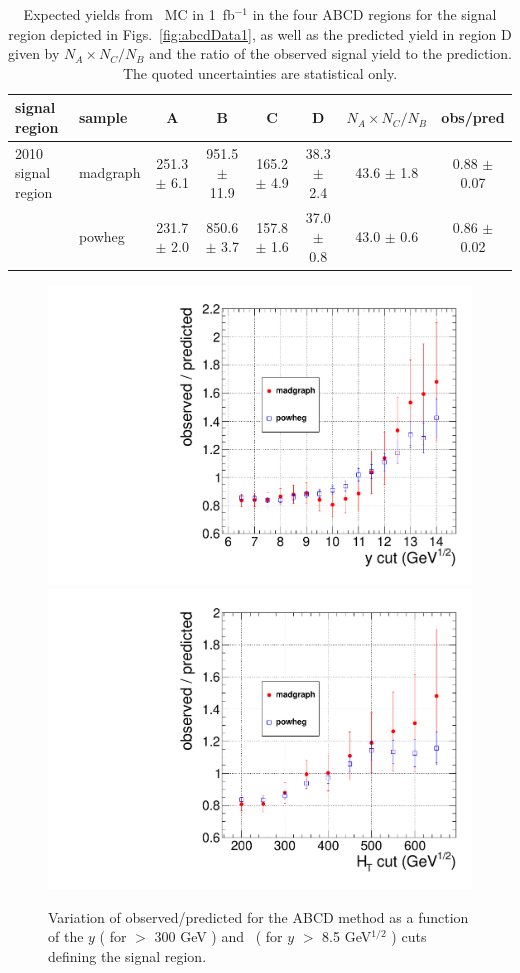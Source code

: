 \begin{table}[h!]
\begin{center}
\caption{\label{tab:mcabcd} Expected yields from \ttbar \, MC in 1~fb$^{-1}$ in the four
ABCD regions for the signal region depicted in Figs.~\ref{fig:abcdData1},
as well as the predicted yield in region D given by $N _A \times N_C / N_B$ and the ratio of
the observed signal yield to the prediction. The quoted uncertainties are statistical only.
}
\vspace{.25cm}
\begin{tabular}{llccccc|c}
\hline
signal region &           sample  &                A  &                B  &                C  &                D  & $N _A \times N_C / N_B$   & obs/pred\\
\hline
\hline
2010 signal region      &   madgraph  & 251.3  $\pm$  6.1  &951.5  $\pm$  11.9  & 165.2  $\pm$  4.9  & 38.3  $\pm$  2.4  & 43.6  $\pm$  1.8  &0.88  $\pm$  0.07 \\
                        &   powheg    & 231.7  $\pm$  2.0  &850.6  $\pm$  3.7   & 157.8  $\pm$  1.6  & 37.0  $\pm$  0.8  & 43.0  $\pm$  0.6  &0.86  $\pm$  0.02 \\
\hline
\end{tabular}
\end{center}
\end{table}






\begin{figure}[h!]
\begin{center}
\includegraphics[width=0.48\linewidth]{plots/abcd_y.pdf}
\includegraphics[width=0.48\linewidth]{plots/abcd_ht.pdf}
\caption{\label{fig:abcdvar}\protect Variation of observed/predicted
for the ABCD method as a function of the $y$ ( for \Ht $>$ 300 GeV ) and 
\Ht\ ( for $y$ $>$ 8.5 GeV$^{1/2}$ ) cuts defining the signal region.}
\end{center}
\end{figure}

